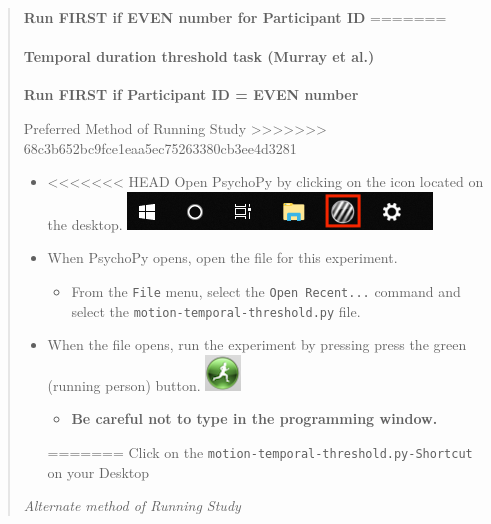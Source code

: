 \documentclass[]{article}
\providecommand{\tightlist}{%
  \setlength{\itemsep}{0pt}\setlength{\parskip}{0pt}}
\let\oldparagraph\paragraph
\renewcommand{\paragraph}[1]{\oldparagraph{#1}\mbox{}}
\begin{document}
\begin{quote}
\textbf{Run FIRST if EVEN number for Participant ID}
=======
\hypertarget{temporal-duration-threshold-task-murray-et-al.}{%
\paragraph{Temporal duration threshold task (Murray et
al.)}\label{temporal-duration-threshold-task-murray-et-al.}}

\textbf{Run FIRST if Participant ID = EVEN number}

Preferred Method of Running Study
>>>>>>> 68c3b652bc9fce1eaa5ec75263380cb3ee4d3281

\begin{itemize}
\tightlist
\item
<<<<<<< HEAD
  Open PsychoPy by clicking on the icon located on the desktop.
  \includegraphics{images/PsychoPy-1.PNG}\\
\item
  When PsychoPy opens, open the file for this experiment.

  \begin{itemize}
  \tightlist
  \item
    From the \texttt{File} menu, select the \texttt{Open\ Recent...}
    command and select the \texttt{motion-temporal-threshold.py} file.
  \end{itemize}
\item
  When the file opens, run the experiment by pressing press the green
  (running person) button. \includegraphics{images/PPrunningMan.png}

  \begin{itemize}
  \tightlist
  \item
    \textbf{Be careful not to type in the programming window.}
  \end{itemize}
=======
  Click on the \texttt{motion-temporal-threshold.py-Shortcut} on your
  Desktop
\end{itemize}

\emph{Alternate method of Running Study}


\end{quote}
\end{document}

